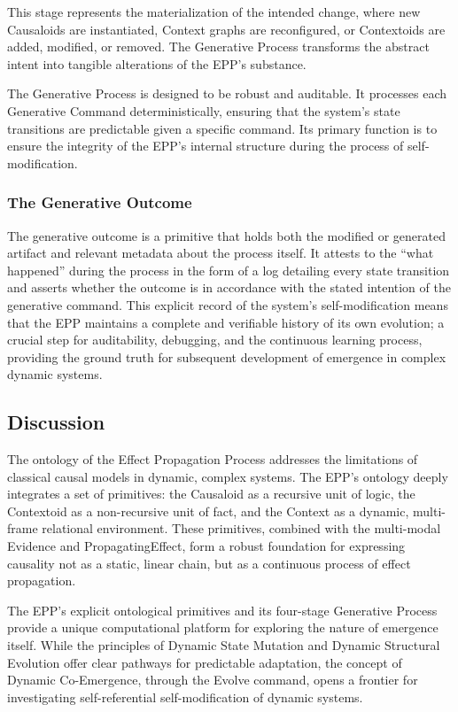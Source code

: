 This stage represents the materialization of the intended change, where new Causaloids are instantiated, Context graphs are reconfigured, or Contextoids are added, modified, or removed. The Generative Process transforms the abstract intent into tangible alterations of the EPP's substance.

The Generative Process is designed to be robust and auditable. It processes each Generative Command deterministically, ensuring that the system's state transitions are predictable given a specific command. Its primary function is to ensure the integrity of the EPP's internal structure during the process of self-modification. 


\subsubsection{The Generative Outcome}
\label{sec:ontology_emgerence_gen_outcome}

The generative outcome is a primitive that holds both the modified or generated artifact and relevant metadata about the process itself. It attests to the “what happened” during the process in the form of a log detailing every state transition and asserts whether the outcome is in accordance with the stated intention of the generative command. This explicit record of the system's self-modification means that the EPP maintains a complete and verifiable history of its own evolution; a crucial step for auditability, debugging, and the continuous learning process, providing the ground truth for subsequent development of emergence in complex dynamic systems.

\newpage

\subsection{Discussion}
\label{sec:ontology_discussion}

The ontology of the Effect Propagation Process addresses the limitations of classical causal models in dynamic, complex systems. The EPP's ontology deeply integrates a set of primitives: the Causaloid as a recursive unit of logic, the Contextoid as a non-recursive unit of fact, and the Context as a dynamic, multi-frame relational environment. These primitives, combined with the multi-modal Evidence and PropagatingEffect, form a robust foundation for expressing causality not as a static, linear chain, but as a continuous process of effect propagation. 

The EPP's explicit ontological primitives and its four-stage Generative Process provide a  unique computational platform for exploring the nature of emergence itself. While the  principles of Dynamic State Mutation and Dynamic Structural Evolution offer clear pathways for  predictable adaptation, the concept of Dynamic Co-Emergence, through the Evolve command, opens a frontier for investigating self-referential self-modification of dynamic systems.

